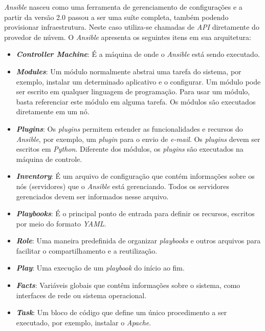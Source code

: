 \textit{Ansible} nasceu como uma ferramenta de gerenciamento de configurações e a partir da versão 2.0 passou a ser uma suíte completa, também podendo provisionar infraestrutura. Neste caso utiliza-se chamadas de \textit{API} diretamente do provedor de núvem. O \textit{Ansible} apresenta os seguintes itens em sua arquitetura: \cite{redhat}

\hfill
 \begin{itemize}
\item \textbf{\textit{Controller Machine}}: É a máquina de onde o \textit{Ansible} está sendo executado. 

\item \textbf{\textit{Modules}}: Um módulo normalmente abstrai uma tarefa do sistema, por exemplo, instalar um determinado aplicativo e o configurar. Um módulo pode ser escrito em qualquer linguagem de programação. Para usar um módulo, basta referenciar este módulo em alguma tarefa. Os módulos são executados diretamente em um nó.   

\item \textbf{\textit{Plugins}}: Os \textit{plugins} permitem estender as funcionalidades e recursos do \textit{Ansible}, por exemplo, um \textit{plugin} para o envio de \textit{e-mail}. Os \textit{plugins} devem ser escritos em \textit{Python}. Diferente dos módulos, os \textit{plugins} são executados na máquina de controle.

\item \textbf{\textit{Inventory}}: É um arquivo de configuração que contém informações sobre os nós (servidores) que o \textit{Ansible} está gerenciando. Todos os servidores gerenciados devem ser informados nesse arquivo.

\item \textbf{\textit{Playbooks}}: É o principal ponto de entrada para definir os recursos, escritos por meio do formato \textit{YAML}.

\item \textbf{\textit{Role}}: Uma maneira predefinida de organizar \textit{playbooks} e outros arquivos para facilitar o compartilhamento e a reutilização.

\item \textbf{\textit{Play}}: Uma execução de um \textit{playbook} do início ao fim.

\item \textbf{\textit{Facts}}: Variáveis globais que contêm informações sobre o sistema, como interfaces de rede ou sistema operacional.

\item \textbf{\textit{Task}}: Um bloco de código que define um único procedimento a ser executado, por exemplo, instalar o \textit{Apache}.
 \end{itemize}
 
